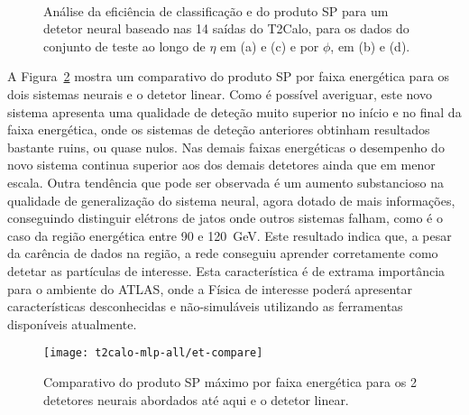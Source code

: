 \begin{figure}
\begin{center}
\mbox{%
}
\mbox{%
}
\end{center}
\caption{Análise da eficiência de classificação e do produto SP para um
detetor neural baseado nas 14 saídas do T2Calo, para os dados do conjunto de
teste ao longo de $\eta$ em (a) e (c) e por $\phi$, em (b) e (d).}
\label{fig:t2calo-mlp-eta-phi}
\end{figure}


A Figura~\ref{fig:t2calo-mlp-all-energy-comp} mostra um comparativo do produto
SP por faixa energética para os dois sistemas neurais e o detetor linear. Como
é possível averiguar, este novo sistema apresenta uma qualidade de deteção
muito superior no início e no final da faixa energética, onde os sistemas de
deteção anteriores obtinham resultados bastante ruins, ou quase nulos. Nas
demais faixas energéticas o desempenho do novo sistema continua superior aos
dos demais detetores ainda que em menor escala. Outra tendência que pode ser
observada é um aumento substancioso na qualidade de generalização do sistema
neural, agora dotado de mais informações, conseguindo distinguir elétrons de
jatos onde outros sistemas falham, como é o caso da região energética entre 90
e 120~GeV. Este resultado indica que, a pesar da carência de dados na região,
a rede conseguiu aprender corretamente como detetar as partículas de
interesse. Esta característica é de extrama importância para o ambiente do
ATLAS, onde a Física de interesse poderá apresentar características
desconhecidas e não-simuláveis utilizando as ferramentas disponíveis
atualmente.

\begin{figure}
\begin{center}
\texttt{[image: t2calo-mlp-all/et-compare]}
\end{center}
\caption{Comparativo do produto SP máximo por faixa energética para os 2
detetores neurais abordados até aqui e o detetor linear.}
\label{fig:t2calo-mlp-all-energy-comp}
\end{figure}


